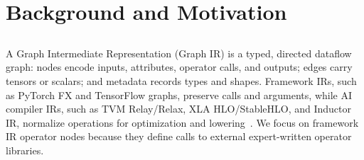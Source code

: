 \section{Background and Motivation}
\label{sec:motivation}

\subsection{}
\label{sec:background:graph-ir}

{\color{red}%
\par}
{\color{blue}%
A Graph Intermediate Representation (Graph IR) is a typed, directed dataflow graph: nodes encode inputs, attributes, operator calls, and outputs; edges carry tensors or scalars; and metadata records types and shapes. Framework IRs, such as PyTorch FX and TensorFlow graphs, preserve calls and arguments, while AI compiler IRs, such as TVM Relay/Relax, XLA HLO/StableHLO, and Inductor IR, normalize operations for optimization and lowering~\cite{roesch2018relay,Lai2023RelaxCA,tensorflow2021xla,stablehlo2024,ansel2024dynamo}. We focus on framework IR operator nodes because they define calls to external expert-written operator libraries.
\par}

